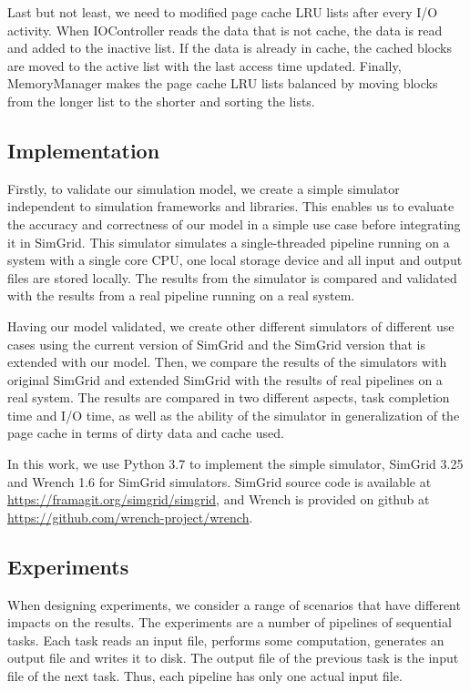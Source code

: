 \documentclass[conference]{IEEEtran}
\begin{document}
			Last but not least, we need to modified page cache LRU lists after 
			every I/O activity. When IOController reads the data that is not cache, 
			the data is read and added to the inactive list. If the data is already 
			in cache, the cached blocks are moved to the active list with the 
			last access time updated. Finally, MemoryManager makes the page cache 
			LRU lists balanced by moving blocks from the longer list to the shorter 
			and sorting the lists.
			
		\subsection{Implementation}

			Firstly, to validate our simulation model, we create a simple 
			simulator independent to simulation frameworks and libraries. 
			This enables us to evaluate the accuracy and correctness of our 
			model in a simple use case before integrating it in SimGrid. 
			This simulator simulates a single-threaded pipeline running on a system 
			with a single core CPU, one local storage device and all input and 
			output files are stored locally. The results from the simulator is compared 
			and validated with the results from a real pipeline running on
			a real system.
			
			Having our model validated, we create other different
			simulators of different use cases using the current version of
			SimGrid and the SimGrid version that is extended with our
			model. Then, we compare the results of the simulators with
			original SimGrid and extended SimGrid with the results of real
			pipelines on a real system. The results are compared in two
			different aspects, task completion time and I/O time, as well
			as the ability of the simulator in generalization of the page
			cache in terms of dirty data and cache used.
		
			In this work, we use Python 3.7 to implement the simple
			simulator, SimGrid 3.25 and Wrench 1.6 for SimGrid simulators. 
			SimGrid source code is available at 
			\url{https://framagit.org/simgrid/simgrid}, and Wrench is provided on
			github at \url{https://github.com/wrench-project/wrench}.
			
		\subsection{Experiments}
		
			When designing experiments, we consider a range of scenarios
			that have different impacts on the results. The experiments are
			a number of pipelines of sequential tasks. Each task reads an
			input file, performs some computation, generates an output file
			and writes it to disk. The output file of the previous task is
			the input file of the next task. Thus, each pipeline has only one
			actual input file. 
			
\end{document}
